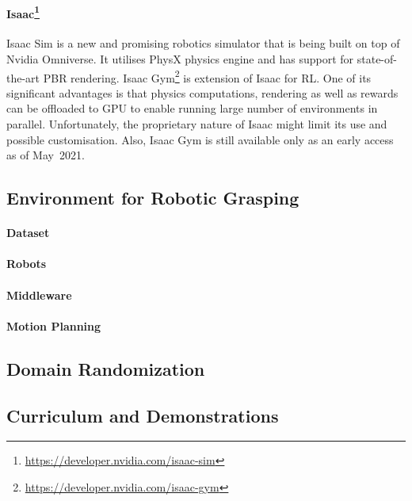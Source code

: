 \paragraph{Isaac\protect\footnote{\href{https://developer.nvidia.com/isaac-sim}{https://developer.nvidia.com/isaac-sim}}} Isaac Sim is a new and promising robotics simulator that is being built on top of Nvidia Omniverse. It utilises PhysX physics engine and has support for state-of-the-art PBR rendering. Isaac Gym\protect\footnote{\href{https://developer.nvidia.com/isaac-gym}{https://developer.nvidia.com/isaac-gym}} is extension of Isaac for RL. One of its significant advantages is that physics computations, rendering as well as rewards can be offloaded to GPU to enable running large number of environments in parallel. Unfortunately, the proprietary nature of Isaac might limit its use and possible customisation. Also, Isaac Gym is still available only as an early access as of May~2021.




\subsection{Environment for Robotic Grasping}


\paragraph{Dataset}

\paragraph{Robots}

\paragraph{Middleware}

\paragraph{Motion Planning}


\subsection{Domain Randomization}


\subsection{Curriculum and Demonstrations}


